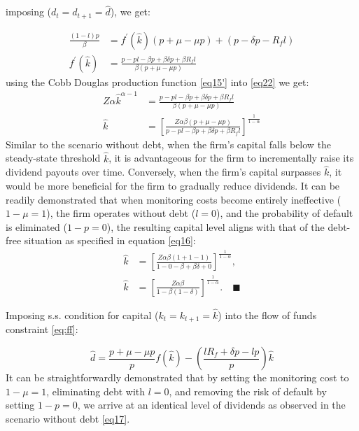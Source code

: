 \documentclass[12pt]{report}
\begin{document}
imposing (\(d_t = d_{t+1} =\hat{d}\)), we get:

\begin{align}
    \frac{\left(1-l \right) p}{\beta} &= f^{\prime}(\hat{k})\left({p+\mu-\mu p}\right) + \left({p-\delta p - R_f l}\right) \nonumber\\
    f^{\prime}(\hat{k})&=\frac{p -p l - \beta p + \beta \delta p + \beta R_f l}{\beta \left(p+\mu-\mu p\right)} \label{eq22}
\end{align}
using the Cobb Douglas production function \ref{eq15'} into \ref{eq22} we get:
\begin{align}
    Z \alpha\hat{k}^{\alpha-1} &= \frac{p -p l - \beta p + \beta \delta p + \beta R_f l}{\beta \left(p+\mu-\mu p\right)} \nonumber \\
    \hat{k} &=\left[\frac{Z \alpha \beta \left(p+\mu-\mu p\right)}{p -p l - \beta p + \beta \delta p + \beta R_f l}\right]^{\frac{1}{1-\alpha}} \label{eq23}
\end{align}
Similar to the scenario without debt, when the firm's capital falls below the steady-state threshold \( \hat{k} \), it
is advantageous for the firm to incrementally raise its dividend payouts over time. Conversely, when the firm's capital
surpasses \( \hat{k} \), it would be more beneficial for the firm to gradually reduce dividends. It can be readily
demonstrated that when monitoring costs become entirely ineffective (\(1-\mu=1\)), the firm operates without debt
(\(l=0\)), and the probability of default is eliminated (\(1-p=0\)), the resulting capital level aligns with that of the
debt-free situation as specified in equation \ref{eq16}: 
\begin{align*}
    \hat{k} &=\left[\frac{Z \alpha \beta \left(1+1-1\right)}{1 -0 - \beta + \beta \delta + 0}\right]^{\frac{1}{1-\alpha}},\\
    \hat{k} &=\left[\frac{Z \alpha \beta}{1 - \beta(1-\delta)}\right]^{\frac{1}{1-\alpha}}.  \quad \blacksquare
\end{align*}

Imposing s.s. condition for capital (\(k_t=k_{t+1}=\hat{k}\)) into the flow of funds constraint \ref{eq:ff}:

\begin{equation}
    \widehat{d} =\frac{p+\mu-\mu p}{p}f(\hat{k})-\left(\frac{l R_f+\delta p - l p}{p}\right)\hat{k} \label{eq:div_opt_path}
\end{equation}
It can be straightforwardly demonstrated that by setting the monitoring cost to \(1-\mu=1\), eliminating debt
with \(l=0\), and removing the risk of default by setting \(1-p=0\), we arrive at an identical level of dividends as
observed in the scenario without debt \ref{eq17}. 
\end{document}

